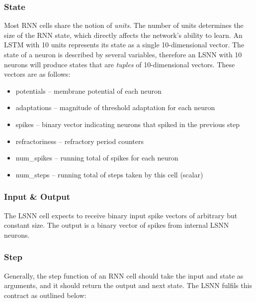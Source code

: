 \documentclass[../../report.tex]{subfiles}
\begin{document}
\subsubsection{State}
Most RNN cells share the notion of \emph{units}. The number of units determines
the size of the RNN state, which directly affects the network's ability to
learn. An LSTM with 10 units represents its state as a single 10-dimensional
vector. The state of a neuron is described by several variables, therefore an
LSNN with 10 neurons will produce states that are \emph{tuples} of
10-dimensional vectors. These vectors are as follows:

\begin{itemize}
  \item potentials -- membrane potential of each neuron
  \item adaptations -- magnitude of threshold adaptation for each neuron
  \item spikes -- binary vector indicating neurons that spiked in the previous step
  \item refractoriness -- refractory period counters
  \item num\_spikes -- running total of spikes for each neuron
  \item num\_steps -- running total of steps taken by this cell (scalar)
\end{itemize}

\subsubsection{Input \& Output}

The LSNN cell expects to receive binary input spike vectors of arbitrary but
constant size. The output is a binary vector of spikes from internal LSNN
neurons.

\subsubsection{Step}

Generally, the step function of an RNN cell should take the input and state as
arguments, and it should return the output and next state. The LSNN fulfils this
contract as outlined below:
\end{document}

